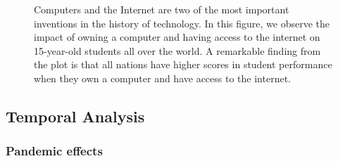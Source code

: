 \documentclass[
  11pt,
  a4paper,
]{article}
\begin{document}
\begin{figure}[H]


\caption{\label{fig-compintplot}Computers and the Internet are two of
the most important inventions in the history of technology. In this
figure, we observe the impact of owning a computer and having access to
the internet on 15-year-old students all over the world. A remarkable
finding from the plot is that all nations have higher scores in student
performance when they own a computer and have access to the internet.}

\end{figure}%

\subsection{Temporal Analysis}\label{temporal-analysis}

\subsubsection{Pandemic effects}\label{pandemic-effects}
\end{document}
